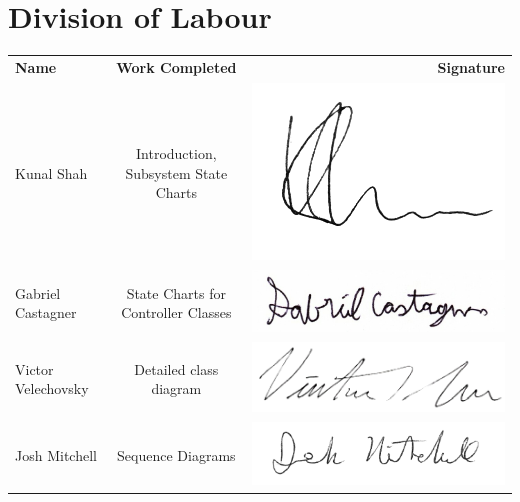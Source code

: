 \documentclass[]{article}
\begin{document}
\section{Division of Labour}
\label{sec:division_of_labour}
\begin{tabular}{l c r}
	\textbf{Name} & \textbf{Work Completed} & \textbf{Signature} \\
	
	Kunal Shah & Introduction, Subsystem State Charts  & 
	\includegraphics[scale=0.2]{../Resources/Signature/Kunal-Sig.png} \\
	
	Gabriel Castagner & State Charts for Controller Classes &
	\includegraphics[scale=0.2]{../Resources/Signature/Gabe-Sig.png} \\
	
	Victor Velechovsky & Detailed class diagram & 
	\includegraphics[scale=0.3]{../Resources/Signature/Vic-Sig.png} \\
	
	Josh Mitchell & Sequence Diagrams & 
	\includegraphics[scale=0.2]{../Resources/Signature/Josh-Sig.png} \\
\end{tabular}
\end{document}
